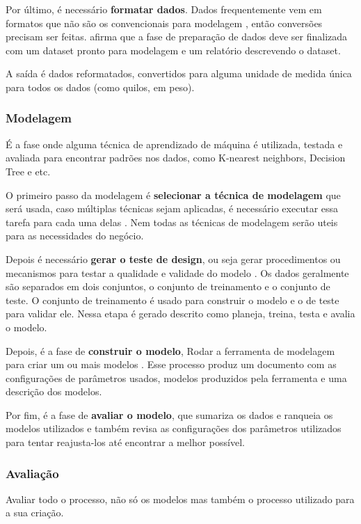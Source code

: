 Por último, é necessário \textbf{formatar dados}. Dados frequentemente vem em formatos que não são os convencionais para modelagem \citep{dmfd}, então conversões precisam ser feitas.  afirma que a fase de preparação de dados deve ser finalizada com um dataset pronto para modelagem e um relatório descrevendo o dataset.

A saída é dados reformatados, convertidos para alguma unidade de medida única para todos os dados (como quilos, em peso).

\subsubsection{Modelagem}
É a fase onde alguma técnica de aprendizado de máquina é utilizada, testada e avaliada para encontrar padrões nos dados, como K-nearest neighbors, Decision Tree e etc.

O primeiro passo da modelagem é \textbf{selecionar a técnica de modelagem} que será usada, caso múltiplas técnicas sejam aplicadas, é necessário executar essa tarefa para cada uma delas \citep{crispmanual}. Nem todas as técnicas de modelagem serão uteis para as necessidades do negócio.

Depois é necessário \textbf{gerar o teste de design}, ou seja gerar procedimentos ou mecanismos para testar a qualidade e validade do modelo \citep{crispmanual}. Os dados geralmente são separados em dois conjuntos, o conjunto de treinamento e o conjunto de teste. O conjunto de treinamento é usado para construir o modelo e o de teste para validar ele. Nessa etapa é gerado descrito como planeja, treina, testa e avalia o modelo.

Depois, é a fase de \textbf{construir o modelo}, Rodar a ferramenta de modelagem para criar um ou mais modelos \citep{crispmanual}. Esse processo produz um documento com as configurações de parâmetros usados, modelos produzidos pela ferramenta e uma descrição dos modelos.

Por fim, é a fase de \textbf{avaliar o modelo}, que sumariza os dados e ranqueia os modelos utilizados e também revisa as configurações dos parâmetros utilizados para tentar reajusta-los até encontrar a melhor possível.

\subsubsection{Avaliação}
Avaliar todo o processo, não só os modelos mas também o processo utilizado para a sua criação.

